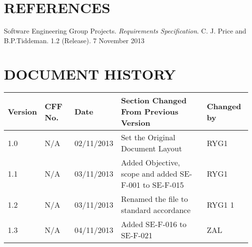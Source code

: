 \documentclass[12pt, portrait]{article}
\begin{document}
\section{REFERENCES}
\begin{thebibliography}{0}
Software Engineering Group Projects.
\emph{Requirements Specification}.
C. J. Price and B.P.Tiddeman. 1.2 (Release). 7 November 2013
\end{thebibliography} 
\newpage 
\section{DOCUMENT HISTORY}
\setlength\LTleft{-0.5cm}
\begin{longtable}{|p{1.3cm}|p{1.5cm}|p{2cm}|p{7cm}| p{2cm}|}
\hline
	Version & CFF No. & Date & Section Changed From Previous Version & Changed by \\
\hline
	1.0&N/A&02/11/2013&Set the Original Document Layout&RYG1
 \\ 
\hline
	1.1&
N/A&
03/11/2013&
Added Objective, scope and added SE-F-001 to SE-F-015&
RYG1
 \\
\hline
	1.2&
N/A&
03/11/2013&
Renamed the file to standard accordance&
RYG1
1 \\
\hline 
	1.3&
N/A&
04/11/2013&
Added SE-F-016 to SE-F-021&
ZAL


\end{longtable}
\end{document}
